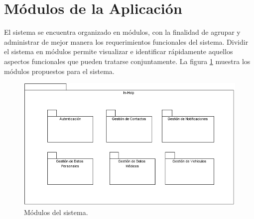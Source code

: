 
\section{Módulos de la Aplicación}

El sistema se encuentra organizado en módulos, con la finalidad de agrupar y administrar de mejor manera los requerimientos funcionales del sistema. Dividir el sistema en módulos permite visualizar e identificar rápidamente aquellos aspectos funcionales que pueden tratarse conjuntamente. La figura \ref{fig:modulos} muestra los módulos propuestos para el sistema.

\begin{figure}[h!]
	\begin{center}
		\includegraphics[scale=0.4]{ModeloComportamiento/imagenes/modulosSistema.png}
		\caption{Módulos del sistema.}
		\label{fig:modulos}
	\end{center}
\end{figure}

%
%	
%		
